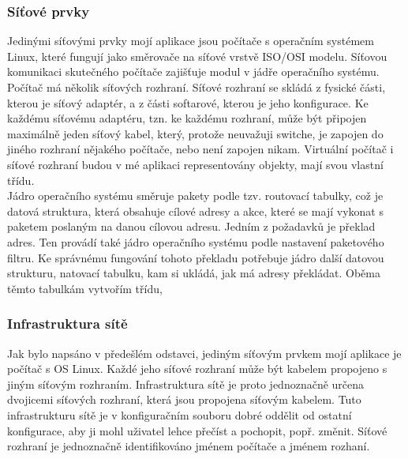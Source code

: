 \subsubsection{Síťové prvky}
Jedinými síťovými prvky mojí aplikace jsou počítače s operačním systémem Linux, které fungují jako směrovače na síťové vrstvě ISO/OSI modelu. Síťovou komunikaci skutečného počítače zajišťuje modul v jádře operačního systému. Počítač má několik síťových rozhraní. Síťové rozhraní se skládá z fysické části, kterou je síťový adaptér, a z části softarové, kterou je jeho konfigurace. Ke každému síťovému adaptéru, tzn. ke každému rozhraní, může být připojen maximálně jeden síťový kabel, který, protože neuvažuji switche, je zapojen do jiného rozhraní nějakého počítače, nebo není zapojen nikam. Virtuální počítač i síťové rozhraní budou v mé aplikaci representovány objekty, mají svou vlastní třídu.\\ 
Jádro operačního systému směruje pakety podle tzv. routovací tabulky, což je datová struktura, která obsahuje cílové adresy a akce, které se mají vykonat s paketem poslaným na danou cílovou adresu. Jedním z požadavků je překlad adres. Ten provádí také jádro operačního systému podle nastavení paketového filtru. Ke správnému fungování tohoto překladu potřebuje jádro další datovou strukturu, natovací tabulku, kam si ukládá, jak má adresy překládat. Oběma těmto tabulkám vytvořím třídu,
\subsubsection{Infrastruktura sítě}
Jak bylo napsáno v předešlém odstavci, jediným síťovým prvkem mojí aplikace je počítač s OS Linux. Každé jeho síťové rozhraní může být kabelem propojeno s jiným síťovým rozhraním. Infrastruktura sítě je proto jednoznačně určena dvojicemi síťových rozhraní, která jsou propojena síťovým kabelem. Tuto infrastrukturu sítě je v konfiguračním souboru dobré oddělit od ostatní konfigurace, aby ji mohl uživatel lehce přečíst a pochopit, popř. změnit. Síťové rozhraní je jednoznačně identifikováno jménem počítače a jménem rozhaní.


